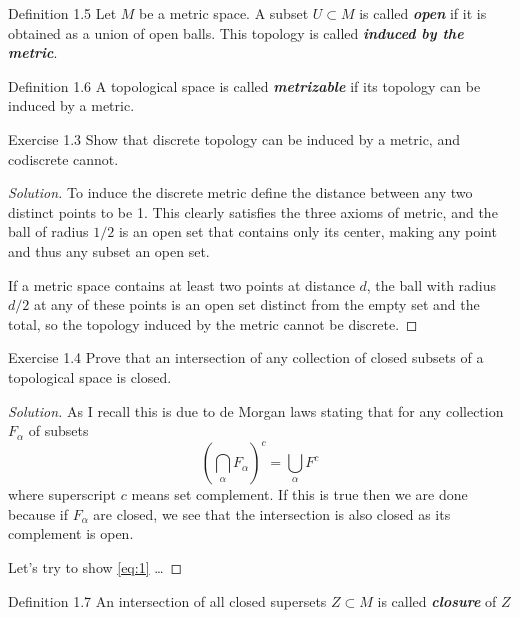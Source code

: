 \begin{thing3}{Definition 1.5}\leavevmode
	Let $M$ be a metric space. A subset $U \subset M$ is called \textit{\textbf{open }} if it is obtained as a union of open balls. This topology is called \textit{\textbf{induced by the metric}}.
\end{thing3}

\begin{thing3}{Definition 1.6}\leavevmode
A topological space is called \textit{\textbf{metrizable}} if its topology can be induced by a metric.	
\end{thing3}

\begin{thing4}{Exercise 1.3}\leavevmode
Show that discrete topology can be induced by a metric, and codiscrete cannot.	
\end{thing4}

\begin{proof}[Solution]\leavevmode
To induce the discrete metric define the distance between any two distinct points to be 1. This clearly satisfies the three axioms of metric, and the ball of radius $1/2$ is an open set that contains only its center, making any point and thus any subset an open set.

If a metric space contains at least two points at distance $d$, the ball with radius $d/2$ at any of these points is an open set distinct from the empty set and the total, so the topology induced by the metric cannot be discrete.
\end{proof}

\begin{thing4}{Exercise 1.4}\leavevmode
	Prove that an intersection of any collection of closed subsets of a topological space is closed.
\end{thing4}

\begin{proof}[Solution]\leavevmode
As I recall this is due to de Morgan laws stating that for any collection $F_\alpha$ of subsets
\begin{equation}\label{eq:1}\left( \bigcap_\alpha F_\alpha  \right)^c=\bigcup_{\alpha} F^c\end{equation}
where superscript $c$ means set complement. If this is true then we are done because if $F_\alpha$ are closed, we see that the intersection is also closed as its complement is open.

{\color{2}Let's try to show \cref{eq:1} …}
\end{proof}

\begin{thing3}{Definition 1.7}\leavevmode
	An intersection of all closed supersets $Z \subset M$ is called \textit{\textbf{closure}} of $Z$
\end{thing3}

